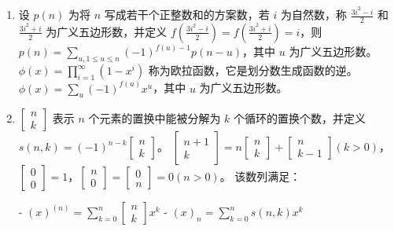 \begin{enumerate}

\item 设 $p(n)$ 为将 $n$ 写成若干个正整数和的方案数，若 $i$ 为自然数，称 $\frac{3i^{2}-i}{2}$ 和 $\frac{3i^{2}+i}{2}$ 为广义五边形数，并定义 $f(\frac{3i^{2}-i}{2}) = f(\frac{3i^{2}+i}{2}) = i$，则 $p(n) = \sum_{u,1 \le u \le n}(-1)^{f(u) - 1}p(n-u)$，其中 $u$ 为广义五边形数。$\displaystyle{\phi(x)=\prod_{i=1}^{\infty}(1-x^{i})}$ 称为欧拉函数，它是划分数生成函数的逆。$\phi(x) = \sum_{u}(-1)^{f(u)}x^{u}$，其中 $u$ 为广义五边形数。

\item $\begin{bmatrix}n\\k\end{bmatrix}$ 表示 $n$ 个元素的置换中能被分解为 $k$ 个循环的置换个数，并定义 $s(n,k)=(-1)^{n-k}\begin{bmatrix}n\\k\end{bmatrix}$。 $\begin{bmatrix}n+1\\k\end{bmatrix}=n\begin{bmatrix}n\\k\end{bmatrix}+\begin{bmatrix}n\\k-1\end{bmatrix}(k>0)$，$\begin{bmatrix}0\\0\end{bmatrix}=1$，$\begin{bmatrix}n\\0\end{bmatrix}=\begin{bmatrix}0\\n\end{bmatrix}=0(n>0)$。
该数列满足：

- $(x)^{(n)}=\sum_{k=0}^{n}\begin{bmatrix}n\\k\end{bmatrix}x^{k}$
- $(x)_{n}=\sum_{k=0}^{n}s(n,k)x^{k}$


\end{enumerate}
